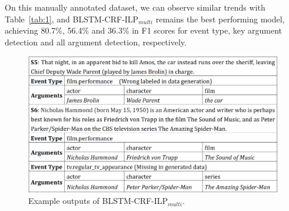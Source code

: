 On this manually annotated dataset, we can observe similar trends with Table~\ref{tab:1}, and BLSTM-CRF-ILP$_{multi}$ remains the best performing model, achieving 80.7\%, 56.4\% and 36.3\% in F1 scores for event type, key argument detection and all argument detection, respectively. 


\begin{figure}[h]
	\centering
	\includegraphics[width=.48\textwidth]{figure3.png}
	\caption{Example outputs of BLSTM-CRF-ILP$_{multi}$.\label{fig:1}}
\end{figure}




